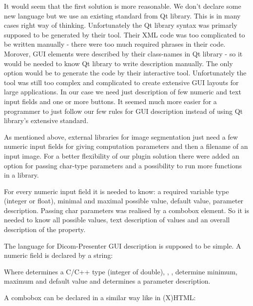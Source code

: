 It would seem that the first solution is more reasonable. We don't declare some new language but we use an existing standard from Qt library. This is in many cases right way of thinking. Unfortunately the Qt library syntax was primarly supposed to be generated by their tool. Their XML code was too complicated to be written manually - there were too much required phrases in their code. Morover, GUI elements were described by their class-names in Qt library - so it would be needed to know Qt library to write description manually. The only option would be to generate the code by their interactive tool. Unfortunately the tool was still too complex and complicated to create extensive GUI layouts for large applications. In our case we need just description of few numeric and text input fields and one or more buttons. It seemed much more easier for a programmer to just follow our few rules for GUI description instead of using Qt library's extensive standard.

As mentioned above, external libraries for image segmentation just need a few numeric input fields for giving computation parameters and then a filename of an input image. For a better flexibility of our plugin solution there were added an option for passing char-type parameters and a possibility to run more functions in a library.

For every numeric input field it is needed to know: a required variable type (integer or float), minimal and maximal possible value, default value, parameter description. Passing char parameters was realised by a combobox element. So it is needed to know all possible values, text description of values and an overall description of the property. 

The language for Dicom-Presenter GUI description is supposed to be simple. A numeric field is declared by a string:


Where  determines a C/C++ type (integer of double), , ,  determine minimum, maximum and default value and  determines a parameter description.

A combobox can be declared in a similar way like in (X)HTML:

\noindent \indent {}\\
\indent \indent {}\\
\indent \indent {}\\
\indent {}

